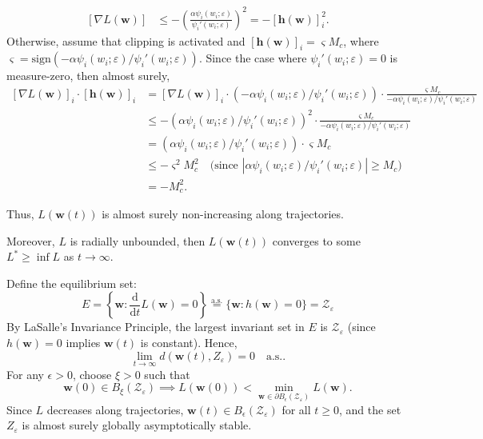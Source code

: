 \documentclass[10pt,a4paper]{article}
\begin{document}
\begin{enumerate}[label=Case \arabic*., leftmargin=2.5cm]
\begin{enumerate}
\[\begin{aligned}[\nabla L(\mathbf{w})]
        &\leq -\left(\frac{\alpha\psi_i(w_i;\varepsilon)}{\psi_i'(w_i;\varepsilon)}\right)^2=-[\mathbf{h}(\mathbf{w})]_i^2. \end{aligned} \] Otherwise, assume that clipping is activated and $[\mathbf{h}(\mathbf{w})]_i=\varsigma M_c$, where $\varsigma=\text{sign}(-\alpha\psi_i(w_i;\varepsilon)/\psi_i'(w_i;\varepsilon))$. Since the case where $\psi_i'(w_i;\varepsilon)=0$ is measure-zero, then almost surely, \[\begin{aligned}[\nabla L(\mathbf{w})]_i\cdot [\mathbf{h}(\mathbf{w})]_i&=[\nabla L(\mathbf{w})]_i\cdot (-\alpha\psi_i(w_i;\varepsilon)/\psi_i'(w_i;\varepsilon))\cdot\frac{\varsigma M_c}{-\alpha\psi_i(w_i;\varepsilon)/\psi_i'(w_i;\varepsilon)}\\
        & \leq -(\alpha\psi_i(w_i;\varepsilon)/\psi_i'(w_i;\varepsilon))^2 \cdot \frac{\varsigma M_c}{-\alpha\psi_i(w_i;\varepsilon)/\psi_i'(w_i;\varepsilon)}\\
        &=(\alpha\psi_i(w_i;\varepsilon)/\psi_i'(w_i;\varepsilon)) \cdot \varsigma M_c\\
        &\leq -\varsigma^2M_c^2\quad\text{(since }|\alpha\psi_i(w_i;\varepsilon)/\psi_i'(w_i;\varepsilon)|\geq M_c\text{)}\\
        &= -M_c^2. \end{aligned} \]
    \end{enumerate}
\end{enumerate}

Thus, $L(\mathbf{w}(t))$ is almost surely non-increasing along trajectories.

Moreover, $L$ is radially unbounded, then $L(\mathbf{w}(t))$ converges to some $L^* \geq \inf L$ as $t \to \infty$.

Define the equilibrium set: \[
E = \left\{ \mathbf{w} : \frac{\text{d}}{\text{d}t}L(\mathbf{w}) = 0 \right\} \overset{\text{a.s.}}{=} \{ \mathbf{w} : h(\mathbf{w}) = 0 \} = \mathcal{Z}_\varepsilon
\] By LaSalle's Invariance Principle, the largest invariant set in $E$ is $\mathcal{Z}_\varepsilon$ (since $h(\mathbf{w}) = 0$ implies $\mathbf{w}(t)$ is constant). Hence,\[\lim_{t \to \infty} d(\mathbf{w}(t), Z_\varepsilon) = 0 \quad \text{a.s.}.\] For any $\epsilon > 0$, choose $\xi > 0$ such that \[\mathbf{w}(0) \in B_\xi(\mathcal{Z}_\varepsilon) \implies L(\mathbf{w}(0)) < \min_{\mathbf{w} \in \partial B_\epsilon(\mathcal{Z}_\varepsilon)} L(\mathbf{w}).\]
Since $L$ decreases along trajectories, $\mathbf{w}(t) \in B_\epsilon(\mathcal{Z}_\varepsilon)$ for all $t \geq 0$, and the set $Z_\varepsilon$ is almost surely globally asymptotically stable.
\end{document}
